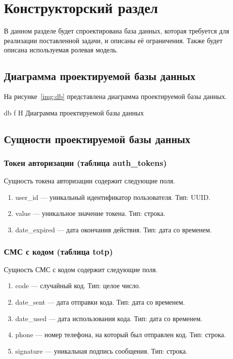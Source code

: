 \chapter{Конструкторский раздел}

В данном разделе будет спроектирована база данных, которая требуется для реализации поставленной задачи, и описаны её ограничения. Также будет описана используемая ролевая модель.

\section{Диаграмма проектируемой базы данных}

На рисунке~\ref{img:db} представлена диаграмма проектируемой базы данных.

{db}
{f}
{H}
{\textwidth}
{Диаграмма проектируемой базы данных}

\section{Сущности проектируемой базы данных}

\subsection{Токен авторизации (таблица auth\_tokens)}

Сущность токена авторизации содержит следующие поля.

\begin{enumerate}
	\item user\_id --- уникальный идентификатор пользователя. Тип: UUID.
	\item value --- уникальное значение токена. Тип: строка.
	\item date\_expired --- дата окончания действия. Тип: дата со временем.
\end{enumerate}

\subsection{СМС с кодом (таблица totp)}

Сущность СМС с кодом содержит следующие поля.

\begin{enumerate}
	\item code --- случайный код. Тип: целое число.
	\item date\_sent --- дата отправки кода. Тип: дата со временем.
	\item date\_used --- дата использования кода. Тип: дата со временем.
	\item phone --- номер телефона, на который был отправлен код. Тип: строка.
	\item signature --- уникальная подпись сообщения. Тип: строка.
\end{enumerate}

